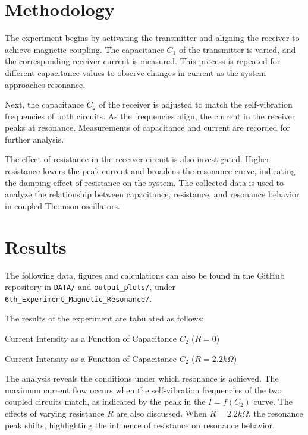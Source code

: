 \documentclass[journal]{IEEEtran}
\begin{document}
\section{Methodology}
The experiment begins by activating the transmitter and aligning the receiver to achieve magnetic coupling. The capacitance \(C_1\) of the transmitter is varied, and the corresponding receiver current is measured. This process is repeated for different capacitance values to observe changes in current as the system approaches resonance.

Next, the capacitance \(C_2\) of the receiver is adjusted to match the self-vibration frequencies of both circuits. As the frequencies align, the current in the receiver peaks at resonance. Measurements of capacitance and current are recorded for further analysis.

The effect of resistance in the receiver circuit is also investigated. Higher resistance lowers the peak current and broadens the resonance curve, indicating the damping effect of resistance on the system. The collected data is used to analyze the relationship between capacitance, resistance, and resonance behavior in coupled Thomson oscillators.


\section{Results}
The following data, figures and calculations can also be found in the GitHub repository \cite{github} in \texttt{DATA/} and \texttt{output\_plots/}, under \texttt{6th\_Experiment\_Magnetic\_Resonance/}.

The results of the experiment are tabulated as follows:

\begin{table}[H]
    \centering
    

    \caption{Current Intensity as a Function of Capacitance \( C_2 \) (\( R = 0 \))}
    \label{tab:c2_r0}
\end{table}

\begin{table}[H]
    \centering
    \caption{Current Intensity as a Function of Capacitance \( C_2 \) (\( R = 2.2k\Omega \))}
    \label{tab:c2_r22}
\end{table}

The analysis reveals the conditions under which resonance is achieved. The maximum current flow occurs when the self-vibration frequencies of the two coupled circuits match, as indicated by the peak in the \( I = f(C_2) \) curve. The effects of varying resistance \( R \) are also discussed. When \( R = 2.2k\Omega \), the resonance peak shifts, highlighting the influence of resistance on resonance behavior.
\end{document}
